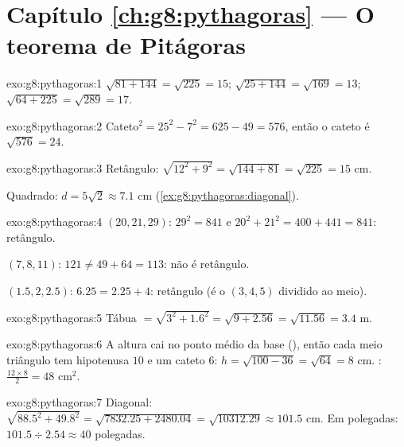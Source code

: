 \section*{Capítulo \ref{ch:g8:pythagoras} --- O teorema de Pitágoras}

\begin{solution}{exo:g8:pythagoras:1}
$\sqrt{81 + 144} = \sqrt{225} = 15$; \quad
$\sqrt{25 + 144} = \sqrt{169} = 13$; \quad
$\sqrt{64 + 225} = \sqrt{289} = 17$.
\end{solution}

\begin{solution}{exo:g8:pythagoras:2}
Cateto$^2 = 25^2 - 7^2 = 625 - 49 = 576$, então o cateto é
$\sqrt{576} = 24$.
\end{solution}

\begin{solution}{exo:g8:pythagoras:3}
Retângulo: $\sqrt{12^2 + 9^2} = \sqrt{144 + 81} = \sqrt{225} = 15$ cm.

Quadrado: $d = 5\sqrt2 \approx 7.1$ cm
(\cref{ex:g8:pythagoras:diagonal}).
\end{solution}

\begin{solution}{exo:g8:pythagoras:4}
$(20, 21, 29)$: $29^2 = 841$ e $20^2 + 21^2 = 400 + 441 = 841$:
retângulo.

$(7, 8, 11)$: $121 \neq 49 + 64 = 113$: não é retângulo.

$(1.5, 2, 2.5)$: $6.25 = 2.25 + 4$: retângulo (é o $(3,4,5)$ dividido
ao meio).
\end{solution}

\begin{solution}{exo:g8:pythagoras:5}
Tábua $= \sqrt{3^2 + 1.6^2} = \sqrt{9 + 2.56} = \sqrt{11.56} = 3.4$ m.
\end{solution}

\begin{solution}{exo:g8:pythagoras:6}
A altura cai no ponto médio da base (), então cada
meio triângulo tem hipotenusa $10$ e um cateto $6$:
$h = \sqrt{100 - 36} = \sqrt{64} = 8$ cm. :
$\frac{12 \times 8}{2} = 48$ cm$^2$.
\end{solution}

\begin{solution}{exo:g8:pythagoras:7}
Diagonal: $\sqrt{88.5^2 + 49.8^2} = \sqrt{7832.25 + 2480.04}
= \sqrt{10312.29} \approx 101.5$ cm. Em polegadas:
$101.5 \div 2.54 \approx 40$ polegadas.
\end{solution}

